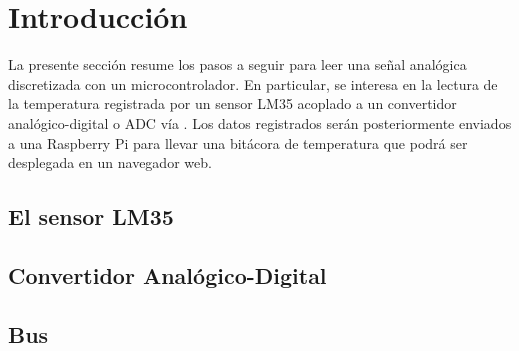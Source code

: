 %
%



\section{Introducción}%
\label{sec:introduction}
La presente sección resume los pasos a seguir para leer una señal analógica discretizada con un microcontrolador.
En particular, se interesa en la lectura de la temperatura registrada por un sensor LM35 acoplado a un convertidor analógico-digital o ADC vía \IIC{}.
Los datos registrados serán posteriormente enviados a una Raspberry Pi para llevar una bitácora de temperatura que podrá ser desplegada en un navegador web.


\subsection{El sensor LM35}%
\label{sec:intro-lm35}


\subsection{Convertidor Analógico-Digital}%
\label{sec:intro-adc}


\subsection{Bus \IIC}%
\label{sec:intro-i2c}


